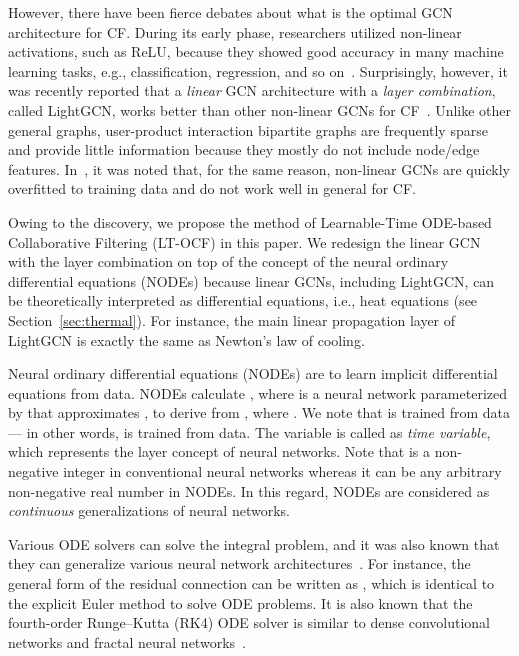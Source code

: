 \documentclass[sigconf]{acmart}
\begin{document}
However, there have been fierce debates about what is the optimal GCN architecture for CF. During its early phase, researchers utilized non-linear activations, such as ReLU, because they showed good accuracy in many machine learning tasks, e.g., classification, regression, and so on~\cite{DBLP:journals/corr/BergKW17,DBLP:conf/kdd/YingHCEHL18,DBLP:conf/mm/WeiWN0HC19,DBLP:conf/www/WangZXLG19,10.1145/3331184.3331267}. Surprisingly, however, it was recently reported that a \emph{linear} GCN architecture with a \emph{layer combination}, called LightGCN, works better than other non-linear GCNs for CF~\cite{10.1145/3331184.3331267,Chen_Wu_Hong_Zhang_Wang_2020,10.1145/3397271.3401063}. Unlike other general graphs, user-product interaction bipartite graphs are frequently sparse and provide little information because they mostly do not include node/edge features. In~\cite{10.1145/3397271.3401063}, it was noted that, for the same reason, non-linear GCNs are quickly overfitted to training data and do not work well in general for CF.

Owing to the discovery, we propose the method of Learnable-Time ODE-based Collaborative Filtering (LT-OCF) in this paper. We redesign the linear GCN with the layer combination on top of the concept of the neural ordinary differential equations (NODEs) because linear GCNs, including LightGCN, can be theoretically interpreted as differential equations, i.e., heat equations (see Section~\ref{sec:thermal}). For instance, the main linear propagation layer of LightGCN is exactly the same as Newton's law of cooling.

Neural ordinary differential equations (NODEs) are to learn implicit differential equations from data. NODEs calculate , where  is a neural network parameterized by  that approximates , to derive  from , where . We note that  is trained from data --- in other words,  is trained from data. The variable  is called as \emph{time variable}, which represents the layer concept of neural networks. Note that  is a non-negative integer in conventional neural networks whereas it can be any arbitrary non-negative real number in NODEs. In this regard, NODEs are considered as \emph{continuous} generalizations of neural networks.

Various ODE solvers can solve the integral problem, and it was also known that they can generalize various neural network architectures~\cite{NIPS2018_7892}. For instance, the general form of the residual connection can be written as , which is identical to the explicit Euler method to solve ODE problems. It is also known that the fourth-order Runge--Kutta (RK4) ODE solver is similar to dense convolutional networks and fractal neural networks~\cite{pmlr-v80-lu18d}.
\end{document}
